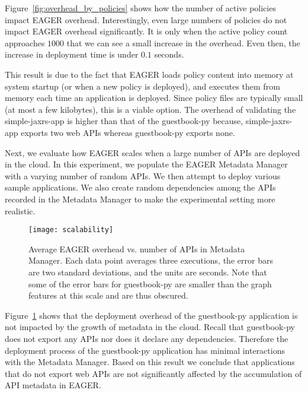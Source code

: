 Figure~\ref{fig:overhead_by_policies} shows how the number of active policies
impact EAGER overhead. Interestingly, even large numbers of policies 
do not impact EAGER overhead significantly. It is only when the active
policy count approaches $1000$ that we can see a small increase in the
overhead. Even then, the increase in deployment time is under $0.1$ seconds. 

This result is due to the fact that EAGER loads policy content into memory at system
startup (or when a new policy is deployed), and executes them from memory each
time an application is deployed. Since policy files are typically small (at
most a few kilobytes), this is a viable option. The overhead of validating the
simple-jaxrs-app is higher than that of the guestbook-py because,
simple-jaxrs-app exports two web APIs whereas guestbook-py exports none. 

Next, we evaluate how EAGER scales when a large number of APIs are deployed 
in the cloud. In this experiment, we populate the EAGER
Metadata Manager with a varying number of random APIs. We then attempt to deploy various sample 
applications. We also create random dependencies among the APIs recorded in the 
Metadata Manager to make the experimental setting more realistic.

\begin{figure}
\centering
\texttt{[image: scalability]}
\caption{Average EAGER overhead vs. number of APIs in Metadata Manager.  Each
data point averages three executions, the error bars are two standard
deviations, and the units are seconds.  Note that some of the error bars for
guestbook-py are smaller than the graph features at this scale and are thus obscured.}
\label{fig:scalability}
\vspace{-0.2in}
\end{figure}

Figure~\ref{fig:scalability} shows that the deployment overhead of the 
guestbook-py application is not impacted by the growth of metadata
in the cloud. Recall that guestbook-py does not export any APIs nor does it 
declare any dependencies. Therefore the deployment process of
the guestbook-py application has minimal interactions with the 
Metadata Manager. Based on this result we conclude that applications that
do not export web APIs are not significantly affected by the accumulation 
of API metadata in EAGER.

